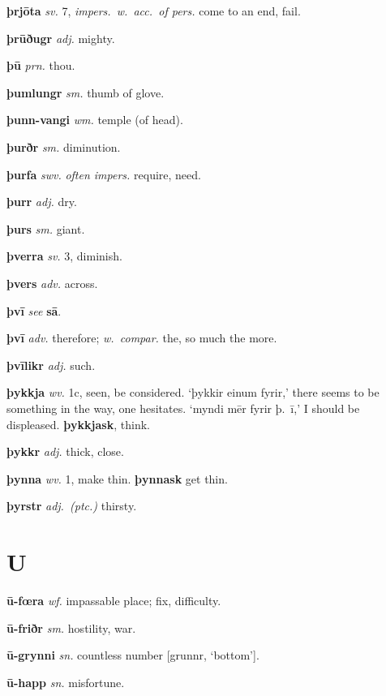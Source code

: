 \documentclass[12pt,letterpaper]{book}
\newcommand\emptypage{\clearpage{\pagestyle{empty}\cleardoublepage}}
\begin{document}
\noindent
\textbf{þrjōta} \textit{sv.} 7, \textit{impers.\ w.\ acc.\ of pers.} come to
	an end, fail.

\noindent
\textbf{þrūðugr} \textit{adj.} mighty.

\noindent
\textbf{þū} \textit{prn.} thou.

\noindent
\textbf{þumlungr} \textit{sm.} thumb of glove.

\noindent
\textbf{þunn-vangi} \textit{wm.} temple (of head).

\noindent
\textbf{þurðr} \textit{sm.} diminution.

\noindent
\textbf{þurfa} \textit{swv.} \textit{often impers.} require, need.

\noindent
\textbf{þurr} \textit{adj.} dry.

\noindent
\textbf{þurs} \textit{sm.} giant.

\noindent
\textbf{þverra} \textit{sv.} 3, diminish.

\noindent
\textbf{þvers} \textit{adv.} across.

\noindent
\textbf{þvī} \textit{} \textit{see} \textbf{sā}.

\noindent
\textbf{þvī} \textit{adv.} therefore; \textit{w.\ compar.} the, so much the
	more.

\noindent
\textbf{þvīlikr} \textit{adj.} such.

\noindent
\textbf{þykkja} \textit{wv.} 1c, seen, be considered.  `þykkir einum
	fyrir,' there seems to be something in the way, one hesitates.
    `myndi mēr fyrir þ.\ ī,' I should be displeased.  \textbf{þykkjask},
    think.

\noindent
\textbf{þykkr} \textit{adj.} thick, close.

\noindent
\textbf{þynna} \textit{wv.} 1, make thin.  \textbf{þynnask} get thin.

\noindent
\textbf{þyrstr} \textit{adj.\ (ptc.)} thirsty.

\emptypage

\chapter*{U}

\noindent
\textbf{ū-fœra} \textit{wf.} impassable place; fix, difficulty.

\noindent
\textbf{ū-friðr} \textit{sm.} hostility, war.

\noindent
\textbf{ū-grynni} \textit{sn.} countless number [grunnr, `bottom'].

\noindent
\textbf{ū-happ} \textit{sn.} misfortune.
\end{document}
